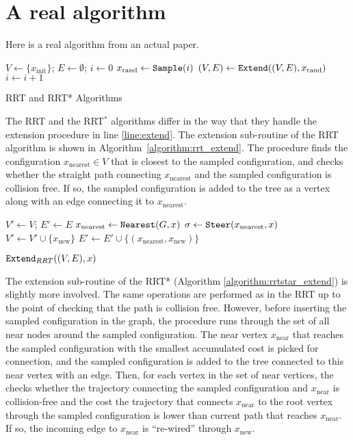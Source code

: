 \documentclass{article}
\begin{document}
\section{A real algorithm}

Here is a real algorithm from an actual paper.


\begin{algorithm}[t] \small
  $V \leftarrow \{ x_\mathrm{init}\}$; $E \leftarrow \emptyset$; $i\leftarrow 0$\; \label{line:initial}
   { \label{line:iteration_start}
    $x_\mathrm{rand} \leftarrow {\tt Sample}(i)$\;  \label{line:sample} 
    $(V, E)\leftarrow {\tt Extend}((V,E),x_\mathrm{rand})$\;  \label{line:extend}
    $i \leftarrow i + 1$\; \label{line:iteration_end}
  }
  \caption{RRT and RRT* Algorithms}
  \label{algorithm:RRT_body}
\end{algorithm}

The RRT and the RRT$^*$ algorithms differ in the way that they handle the extension procedure in line \ref{line:extend}.
%
The extension sub-routine of the RRT algorithm is shown in Algorithm~\ref{algorithm:rrt_extend}. 
%
The procedure finds the configuration $x_\mathrm{nearest} \in V$ that is closest to the sampled configuration, and checks whether the straight path connecting $x_\mathrm{nearest}$ and the sampled configuration is collision free. If so, the sampled configuration is added to the tree as a vertex along with an edge connecting it to $x_\mathrm{nearest}$.

\begin{algorithm}[t] \small
    $V' \leftarrow V$; $E' \leftarrow E$\;
    $x_\mathrm{nearest} \leftarrow {\tt Nearest} (G,x)$\; 
    $\sigma \leftarrow {\tt Steer} (x_\mathrm{nearest}, x)$\; 
    {
        $V' \leftarrow V' \cup \{x_\mathrm{new}\}$\; 
        $E' \leftarrow E' \cup \{ (x_\mathrm{nearest}, x_\mathrm{new})\}$\; 
    }
    \caption{${\tt Extend}_{RRT} ((V,E), x)$}
    \label{algorithm:rrt_extend}
\end{algorithm}

The extension sub-routine of the RRT* (Algorithm \ref{algorithm:rrtstar_extend}) is slightly more involved. 
%
The same operations are performed as in the RRT up to the point of checking that the path is collision free. 
%
However, before inserting the sampled configuration in the graph, the procedure runs through the set of all near nodes around the sampled configuration. The near vertex $x_\mathrm{near}$ that reaches the sampled configuration with the smallest accumulated cost is picked for connection, and the sampled configuration is added to the tree connected to this near vertex with an edge. 
%
Then, for each vertex in the set of near vertices, the checks whether the trajectory connecting the sampled configuration and $x_\mathrm{near}$ is collision-free and the cost the trajectory that connects $x_\mathrm{near}$ to the root vertex through the sampled configuration is lower than current path that reaches $x_\mathrm{near}$.
%
If so, the incoming edge to $x_\mathrm{near}$ is ``re-wired'' through $x_\mathrm{new}$.
\end{document}
